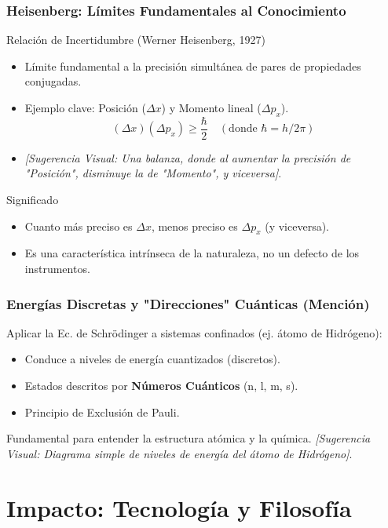 \documentclass{beamer}
\begin{document}
	\begin{frame}
		\frametitle{Heisenberg: Límites Fundamentales al Conocimiento}
		\begin{block}{Relación de Incertidumbre (Werner Heisenberg, 1927)}
			\begin{itemize}
				\item Límite fundamental a la precisión simultánea de pares de propiedades conjugadas.
				\item Ejemplo clave: Posición ($\Delta x$) y Momento lineal ($\Delta p_x$).
				\[ (\Delta x) (\Delta p_x) \geq \frac{\hbar}{2} \quad (\text{donde } \hbar = h/2\pi) \]
				\item \textit{[Sugerencia Visual: Una balanza, donde al aumentar la precisión de "Posición", disminuye la de "Momento", y viceversa]}.
			\end{itemize}
		\end{block}
		\pause
		\begin{alertblock}{Significado}
			\begin{itemize}
				\item Cuanto más preciso es $\Delta x$, menos preciso es $\Delta p_x$ (y viceversa).
				\item Es una característica intrínseca de la naturaleza, no un defecto de los instrumentos.
			\end{itemize}
		\end{alertblock}
	\end{frame}
	
	\begin{frame}
		\frametitle{Energías Discretas y "Direcciones" Cuánticas (Mención)}
		Aplicar la Ec. de Schrödinger a sistemas confinados (ej. átomo de Hidrógeno):
		\begin{itemize}
			\item Conduce a niveles de energía cuantizados (discretos). \pause
			\item Estados descritos por \textbf{Números Cuánticos} (n, l, m, s). \pause
			\item Principio de Exclusión de Pauli.
		\end{itemize}
		\pause
		Fundamental para entender la estructura atómica y la química.
		\pause
		\textit{[Sugerencia Visual: Diagrama simple de niveles de energía del átomo de Hidrógeno]}.
	\end{frame}
	
	\section{Impacto: Tecnología y Filosofía}
	
\end{document}

